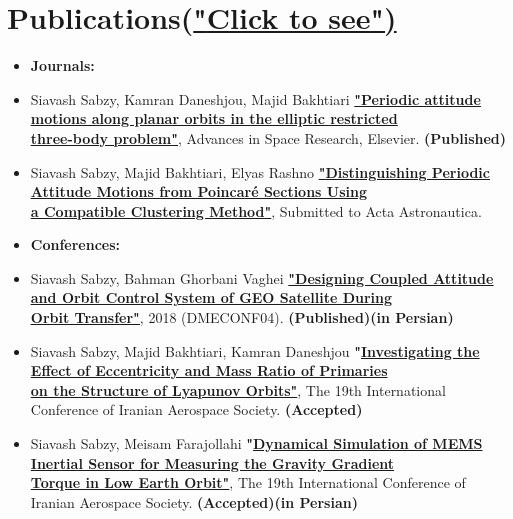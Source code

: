 \documentclass[10pt,a4paper,sans]{moderncv} %
\begin{document}
\section{Publications(\href{https://www.researchgate.net/profile/Siavash_Sabzy/publications}{"\underline{Click to see}")}}
\begin{itemize}

\item\textbf{Journals:}
\item Siavash Sabzy, Kamran Daneshjou, Majid Bakhtiari 
 \textbf{\href{https://doi.org/10.1016/j.asr.2021.01.019}{"\underline{Periodic attitude motions along planar orbits in the elliptic restricted} \\ \underline{three-body problem}"}}, Advances in Space Research, Elsevier. \textbf{(Published)}
\item Siavash Sabzy, Majid Bakhtiari, Elyas Rashno 
 \textbf{\href{......}{"\underline{Distinguishing Periodic Attitude Motions from Poincaré Sections Using } \\ \underline{a Compatible Clustering Method}"}}, Submitted to Acta Astronautica.\\

\item\textbf{Conferences:}
\item Siavash Sabzy, Bahman Ghorbani Vaghei
 \textbf{\href{https://civilica.com/doc/881918/}{"\underline{Designing Coupled Attitude and Orbit Control System of GEO Satellite During} \\ \underline{Orbit Transfer"}}}, 2018 (DMECONF04). \textbf{(Published)(in Persian)}
 
 \item Siavash Sabzy, Majid Bakhtiari, Kamran Daneshjou
 \textbf{"\underline{Investigating the Effect of Eccentricity and Mass Ratio of Primaries} \\ \underline{ on the Structure of Lyapunov Orbits"}}, The 19th International Conference of Iranian Aerospace Society. \textbf{(Accepted)}
 
 \item Siavash Sabzy, Meisam Farajollahi
 \textbf{"\underline{Dynamical Simulation of MEMS Inertial Sensor for Measuring the Gravity Gradient } \\ \underline{ Torque in Low Earth Orbit"}}, The 19th International Conference of Iranian Aerospace Society. \textbf{(Accepted)(in Persian)}



\end{itemize}
\end{document}
